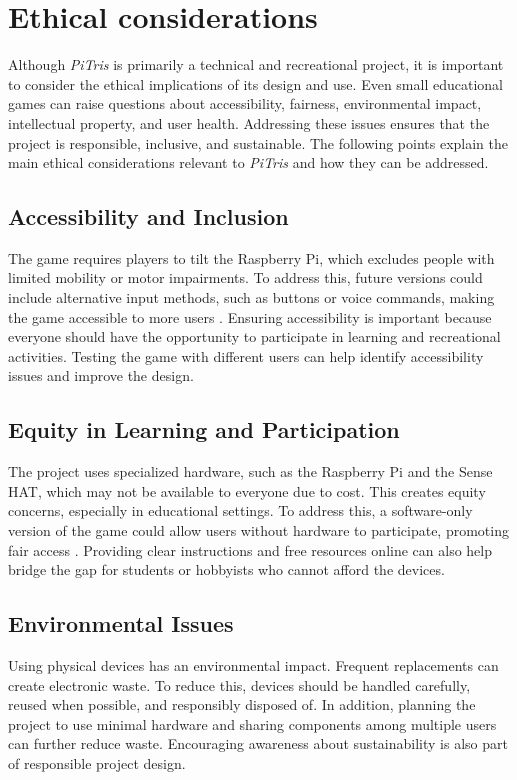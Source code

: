\documentclass[11pt,titlepage,openright]{book}
\begin{document}
\chapter{Ethical considerations}
Although \textit{PiTris} is primarily a technical and recreational project, it is important to consider the ethical implications of its design and use. Even small educational games can raise questions about accessibility, fairness, environmental impact, intellectual property, and user health. Addressing these issues ensures that the project is responsible, inclusive, and sustainable. The following points explain the main ethical considerations relevant to \textit{PiTris} and how they can be addressed.

\section{Accessibility and Inclusion}
The game requires players to tilt the Raspberry Pi, which excludes people with limited mobility or motor impairments. To address this, future versions could include alternative input methods, such as buttons or voice commands, making the game accessible to more users \cite{Seale2014}. Ensuring accessibility is important because everyone should have the opportunity to participate in learning and recreational activities. Testing the game with different users can help identify accessibility issues and improve the design.

\section{Equity in Learning and Participation}
The project uses specialized hardware, such as the Raspberry Pi and the Sense HAT, which may not be available to everyone due to cost. This creates equity concerns, especially in educational settings. To address this, a software-only version of the game could allow users without hardware to participate, promoting fair access \cite{Binns2018}. Providing clear instructions and free resources online can also help bridge the gap for students or hobbyists who cannot afford the devices.

\section{Environmental Issues}
Using physical devices has an environmental impact. Frequent replacements can create electronic waste. To reduce this, devices should be handled carefully, reused when possible, and responsibly disposed of. In addition, planning the project to use minimal hardware and sharing components among multiple users can further reduce waste. Encouraging awareness about sustainability is also part of responsible project design.
\end{document}
